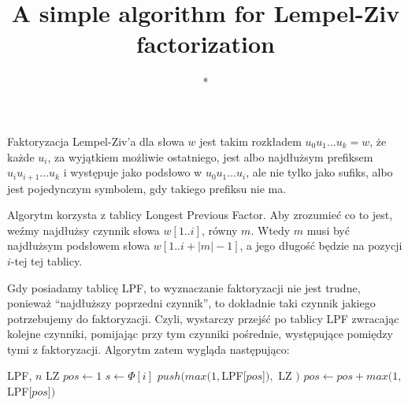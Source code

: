 \documentclass[a4paper,12pt]{article}
\title{A simple algorithm for Lempel-Ziv factorization}
\author{*}
\begin{document}
\maketitle

Faktoryzacja Lempel-Ziv'a dla słowa $w$ jest takim rozkładem $u_0 u_1 ... u_k = w$,
że każde $u_i$, za wyjątkiem możliwie ostatniego,
jest albo najdłużsym prefiksem $u_i u_{i + 1} ... u_k$ i występuje jako podsłowo w $u_0 u_1 ... u_i$,
ale nie tylko jako sufiks,
albo jest pojedynczym symbolem, gdy takiego prefiksu nie ma.

Algorytm korzysta z tablicy Longest Previous Factor.
Aby zrozumieć co to jest, weźmy najdłużsy czynnik słowa $w[1..i]$, równy $m$.
Wtedy $m$ musi być najdłużsym podsłowem słowa $w[1..i + |m| - 1]$,
a jego długość będzie na pozycji $i$-tej tej tablicy.

Gdy posiadamy tablicę LPF, to wyznaczanie faktoryzacji nie jest trudne,
ponieważ ``najdłuższy poprzedni czynnik'', to dokładnie taki czynnik jakiego potrzebujemy do faktoryzacji.
Czyli, wystarczy przejść po tablicy LPF zwracając kolejne czynniki,
pomijając przy tym czynniki pośrednie, występujące pomiędzy tymi z faktoryzacji.
Algorytm zatem wygląda następująco:

\begin{algorithmic} 
\REQUIRE LPF, $n$
\ENSURE LZ
\STATE $pos \gets 1$
\STATE $s \gets \Phi[i]$
\STATE $push(max(1, $LPF[$pos$]$),$ LZ $)$
\STATE $pos \gets pos + max(1, $LPF[$pos$]$)$
\ENDWHILE
\end{algorithmic}
\end{document}
